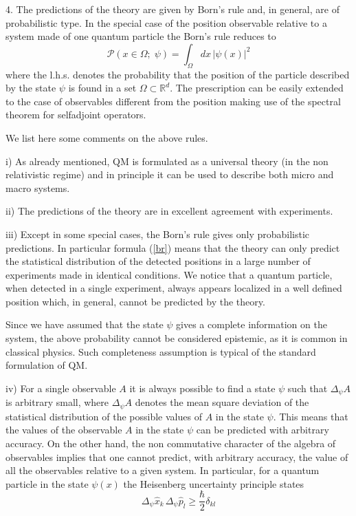 \documentclass[12pt,reqno]{amsart}
\newcommand{\erre}{\mathbb{R}}
\newcommand{\n}{\relax}
\newcommand{\vs}{\vspace{0.5cm}}
\newcommand{\f}{\frac}
\newcommand{\be}{\begin{equation}}
\newcommand{\ee}{\end{equation}}
\numberwithin{equation}{section}
\begin{document}
4. The predictions of the theory are given by  Born's rule and, in general, are of probabilistic type. 
In the special case of the position observable relative to a system made of one quantum particle  the Born's rule reduces to
\be\label{br}
{\mathcal P}(x \in \Omega; \; \psi)= \int_{\Omega} \!dx \, |\psi (x)|^2
\ee
where the l.h.s. denotes the probability that the position of the  particle described by the state $\psi$ is found in a  set $\Omega \subset \erre^d$.  
The prescription can be easily extended to the case of  observables different from the position making use of the spectral theorem for selfadjoint operators.

\vs


\n
We list here some comments on the above rules. 


i)  As already mentioned, QM is formulated as a universal theory (in the non relativistic regime) and in principle it can be used to describe both micro and macro systems.


ii)  The predictions of the theory are in excellent agreement with experiments.


iii) Except in some special cases, the Born's rule gives only probabilistic predictions. In particular formula (\ref{br}) means that the theory can only predict the statistical distribution of the detected positions in a large number of experiments made in identical conditions. We notice  that a quantum particle, when detected in a single experiment, always appears localized in a well defined position which, in general, cannot be predicted by the theory. 




\n
Since we have assumed that the state $\psi$ gives a complete information on the system, the above probability cannot be considered epistemic, as it is common in classical physics.  Such  completeness assumption is typical of the standard formulation of QM.



iv)  For a single observable $A$ it is always possible to find a state $\psi$ such that $\Delta_{\psi} A$ is arbitrary small, where $\Delta_{\psi} A$ denotes the mean square deviation of the statistical distribution of the possible values of $A$ in the state $\psi$. This means that the values of the observable $A$ in the state $\psi $ can be predicted with arbitrary accuracy.  On the other hand, the non commutative character of the algebra of observables implies that one cannot predict, with arbitrary accuracy, the value of all the observables relative to a given system. In particular, for a quantum particle in the state $\psi(x)$  the Heisenberg uncertainty principle states
\be\label{ind}
\Delta_{\psi} \hat{x}_k \, \Delta_{\psi} \hat{p}_l \geq \f{\hbar}{2} \delta_{kl}
\ee
\end{document}
